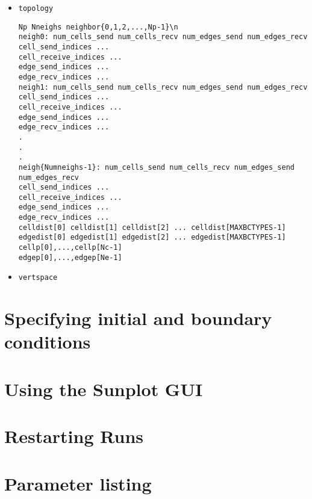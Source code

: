 \documentclass[12pt,oneside]{article}
\begin{document}
\begin{itemize}
\begin{itemize}
in its list of \verb+Edge{1-3}+ pointers.  The \verb+gradf{1,2}+ index is a number from 
0 to 2 which determines which face number this edge is of a particular cell.
\item \verb+mark+ Contains the marker type for this edge.  All edges with the value 0 are
computational edges, while other values are described in Section \ref{sec:initial}.
\end{itemize}
\item \verb+topology+
\begin{verbatim}
Np Nneighs neighbor{0,1,2,...,Np-1}\n
neigh0: num_cells_send num_cells_recv num_edges_send num_edges_recv
cell_send_indices ...
cell_receive_indices ...
edge_send_indices ...
edge_recv_indices ...
neigh1: num_cells_send num_cells_recv num_edges_send num_edges_recv
cell_send_indices ...
cell_receive_indices ...
edge_send_indices ...
edge_recv_indices ...
.
.
.
neigh{Numneighs-1}: num_cells_send num_cells_recv num_edges_send num_edges_recv
cell_send_indices ...
cell_receive_indices ...
edge_send_indices ...
edge_recv_indices ...
celldist[0] celldist[1] celldist[2] ... celldist[MAXBCTYPES-1]
edgedist[0] edgedist[1] edgedist[2] ... edgedist[MAXBCTYPES-1]
cellp[0],...,cellp[Nc-1]
edgep[0],...,edgep[Ne-1]
\end{verbatim}
\item \verb+vertspace+

\end{itemize}

\section{Specifying initial and boundary conditions} \label{sec:initial}

\section{Using the Sunplot GUI}

\section{Restarting Runs} \label{sec:restart}

\appendix

\section{Parameter listing} \label{app:params}



\end{document}
